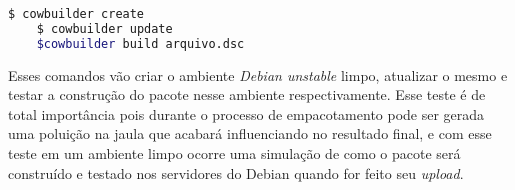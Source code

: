 \begin{lstlisting}[language=bash]
	$ cowbuilder create
	$ cowbuilder update
	$cowbuilder build arquivo.dsc
\end{lstlisting} 

Esses comandos vão criar o ambiente \textit{Debian unstable} limpo, atualizar o mesmo e testar a construção do pacote nesse ambiente respectivamente. Esse teste é de total importância pois durante o processo de empacotamento pode ser gerada uma poluição na jaula que acabará influenciando no resultado final, e com esse teste em um ambiente limpo ocorre uma simulação de como o pacote será construído e testado nos servidores do Debian quando for feito seu \textit{upload}.